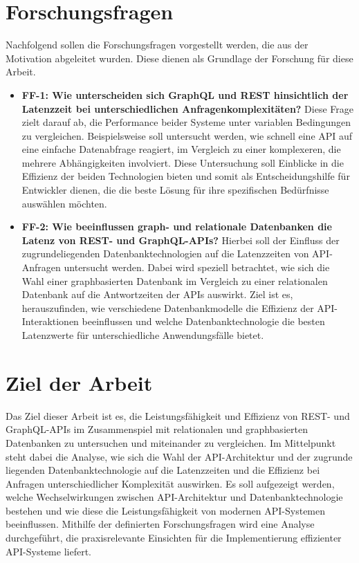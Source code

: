 \section{Forschungsfragen} %
\label{sec:forschungsfragen}
Nachfolgend sollen die Forschungsfragen vorgestellt werden, die aus der Motivation abgeleitet wurden. Diese dienen als Grundlage der Forschung für diese Arbeit.
\begin{itemize}
	\item \textbf{FF-1: Wie unterscheiden sich GraphQL und REST hinsichtlich der Latenzzeit bei unterschiedlichen Anfragenkomplexitäten?}  Diese Frage zielt darauf ab, die Performance beider Systeme unter variablen Bedingungen zu vergleichen. Beispielsweise soll untersucht werden, wie schnell eine API auf eine einfache Datenabfrage reagiert, im Vergleich zu einer komplexeren, die mehrere Abhängigkeiten involviert. Diese Untersuchung soll Einblicke in die Effizienz der beiden Technologien bieten und somit als Entscheidungshilfe für Entwickler dienen, die die beste Lösung für ihre spezifischen Bedürfnisse auswählen möchten.
	\item \textbf{FF-2: Wie beeinflussen graph- und relationale Datenbanken die Latenz von REST- und GraphQL-APIs?} Hierbei soll der Einfluss der zugrundeliegenden Datenbanktechnologien auf die Latenzzeiten von API-Anfragen untersucht werden. Dabei wird speziell betrachtet, wie sich die Wahl einer graphbasierten Datenbank im Vergleich zu einer relationalen Datenbank auf die Antwortzeiten der APIs auswirkt. Ziel ist es, herauszufinden, wie verschiedene Datenbankmodelle die Effizienz der API-Interaktionen beeinflussen und welche Datenbanktechnologie die besten Latenzwerte für unterschiedliche Anwendungsfälle bietet.
\end{itemize} 
\section{Ziel der Arbeit} %
\label{sec:zielderarbeit}
Das Ziel dieser Arbeit ist es, die Leistungsfähigkeit und Effizienz von REST- und GraphQL-APIs im Zusammenspiel mit relationalen und graphbasierten Datenbanken zu untersuchen und miteinander zu vergleichen. Im Mittelpunkt steht dabei die Analyse, wie sich die Wahl der API-Architektur und der zugrunde liegenden Datenbanktechnologie auf die Latenzzeiten und die Effizienz bei Anfragen unterschiedlicher Komplexität auswirken. Es soll aufgezeigt werden, welche Wechselwirkungen zwischen API-Architektur und Datenbanktechnologie bestehen und wie diese die Leistungsfähigkeit von modernen API-Systemen beeinflussen. Mithilfe der definierten Forschungsfragen wird eine Analyse durchgeführt, die praxisrelevante Einsichten für die Implementierung effizienter API-Systeme liefert.
\newpage
